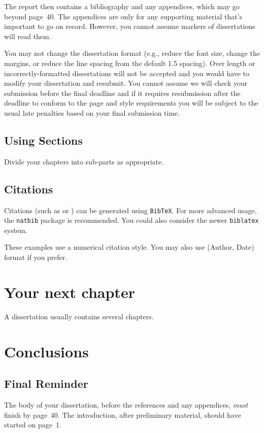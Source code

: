 \documentclass[msc,deptreport]{infthesis} %
\begin{document}
The report then contains a bibliography and any appendices, which may go beyond
page~40. The appendices are only for any supporting material that's important to
go on record. However, you cannot assume markers of dissertations will read them.

You may not change the dissertation format (e.g., reduce the font
size, change the margins, or reduce the line spacing from the default
1.5 spacing). Over length or incorrectly-formatted dissertations will
not be accepted and you would have to modify your dissertation and
resubmit.  You cannot assume we will check your submission before the
final deadline and if it requires resubmission after the deadline to
conform to the page and style requirements you will be subject to the
usual late penalties based on your final submission time.

\section{Using Sections}

Divide your chapters into sub-parts as appropriate.

\section{Citations}

Citations (such as \cite{P1} or \cite{P2}) can be generated using
\texttt{BibTeX}. For more advanced usage, the \texttt{natbib} package is
recommended. You could also consider the newer \texttt{biblatex} system.

These examples use a numerical citation style. You may also use
(Author, Date) format if you prefer.

\chapter{Your next chapter}

A dissertation usually contains several chapters.

\chapter{Conclusions}

\section{Final Reminder}

The body of your dissertation, before the references and any appendices,
\emph{must} finish by page~40. The introduction, after preliminary material,
should have started on page~1.
\end{document}
